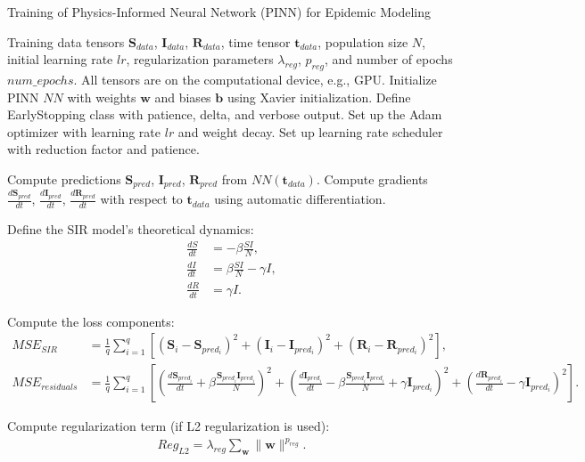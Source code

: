 \documentclass[12pt]{article}
\begin{document}
\begin{algorithm}
\caption{Training of Physics-Informed Neural Network (PINN) for Epidemic Modeling}
\begin{algorithmic}[1]
\Require Training data tensors $\bm{S}_{data}$, $\bm{I}_{data}$, $\bm{R}_{data}$, time tensor $\bm{t}_{data}$, population size $N$, initial learning rate $lr$, regularization parameters $\lambda_{reg}$, $p_{reg}$, and number of epochs $num\_epochs$.
\Ensure All tensors are on the computational device, e.g., GPU.
\State Initialize PINN $NN$ with weights $\bm{w}$ and biases $\bm{b}$ using Xavier initialization.
\State Define EarlyStopping class with patience, delta, and verbose output.
\State Set up the Adam optimizer with learning rate $lr$ and weight decay.
\State Set up learning rate scheduler with reduction factor and patience.

    \State Compute predictions $\bm{S}_{pred}$, $\bm{I}_{pred}$, $\bm{R}_{pred}$ from $NN(\bm{t}_{data})$.
    \State Compute gradients $\frac{d\bm{S}_{pred}}{dt}$, $\frac{d\bm{I}_{pred}}{dt}$, $\frac{d\bm{R}_{pred}}{dt}$ with respect to $\bm{t}_{data}$ using automatic differentiation.
    
    \State Define the SIR model's theoretical dynamics:
    \begin{align*}
    \frac{dS}{dt} & = -\beta \frac{S I}{N}, \\
    \frac{dI}{dt} & = \beta \frac{S I}{N} - \gamma I, \\
    \frac{dR}{dt} & = \gamma I.
    \end{align*}
    
    \State Compute the loss components:
    \begin{align*}
    MSE_{SIR} & = \frac{1}{q} \sum_{i=1}^{q} \left[ \left(\bm{S}_{i} - \bm{S}_{pred_i}\right)^2 + \left(\bm{I}_{i} - \bm{I}_{pred_i}\right)^2 + \left(\bm{R}_{i} - \bm{R}_{pred_i}\right)^2 \right], \\
    MSE_{residuals} & = \frac{1}{q} \sum_{i=1}^{q} \left[ \left(\frac{d\bm{S}_{pred_i}}{dt} + \beta \frac{\bm{S}_{pred_i} \bm{I}_{pred_i}}{N}\right)^2 + \left(\frac{d\bm{I}_{pred_i}}{dt} - \beta \frac{\bm{S}_{pred_i} \bm{I}_{pred_i}}{N} + \gamma \bm{I}_{pred_i}\right)^2 + \left(\frac{d\bm{R}_{pred_i}}{dt} - \gamma \bm{I}_{pred_i}\right)^2 \right].
    \end{align*}
    
    \State Compute regularization term (if L2 regularization is used):
    \begin{align*}
    Reg_{L2} = \lambda_{reg} \sum_{\bm{w}} \|\bm{w}\|^{p_{reg}}.
    \end{align*}
    

\end{algorithmic}
\end{algorithm}
\end{document}
